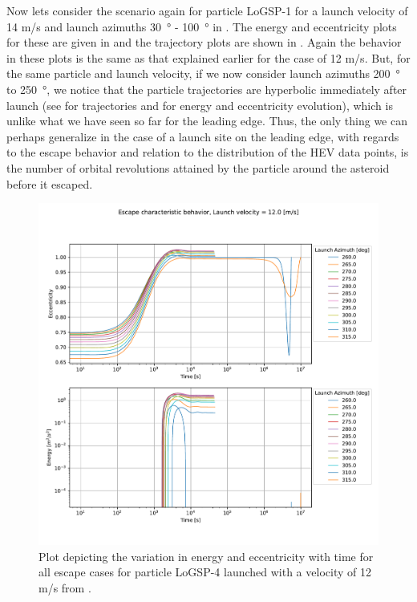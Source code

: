 \FloatBarrier
Now lets consider the scenario again for particle LoGSP-1 for a launch velocity of 14 m/s and launch azimuths \SI{30}{\degree} - \SI{100}{\degree} in . The energy and eccentricity plots for these are given in  and the trajectory plots are shown in . Again the behavior in these plots is the same as that explained earlier for the case of 12 m/s. But, for the same particle and launch velocity, if we now consider launch azimuths \SI{200}{\degree} to \SI{250}{\degree}, we notice that the particle trajectories are hyperbolic immediately after launch (see  for trajectories and  for energy and eccentricity evolution), which is unlike what we have seen so far for the leading edge. Thus, the only thing we can perhaps generalize in the case of a launch site on the leading edge, with regards to the escape behavior and relation to the distribution of the \gls{HEV} data points, is the number of orbital revolutions attained by the particle around the asteroid before it escaped.
\begin{figure}[htb]
\centering
\captionsetup{justification=centering}
\includegraphics[width=\textwidth, height=0.4\textheight, keepaspectratio=true]{leading_edge_perturbations/logsp4_escape_energy_ecc_12ms_solarPhase225.pdf}
\caption{Plot depicting the variation in energy and eccentricity with time for all escape cases for particle LoGSP-4 launched with a velocity of 12 m/s from \protect{}.}
\label{fig:leadingEdge_logsp4_escape_energy_ecc_12ms_solar225}
\end{figure}
